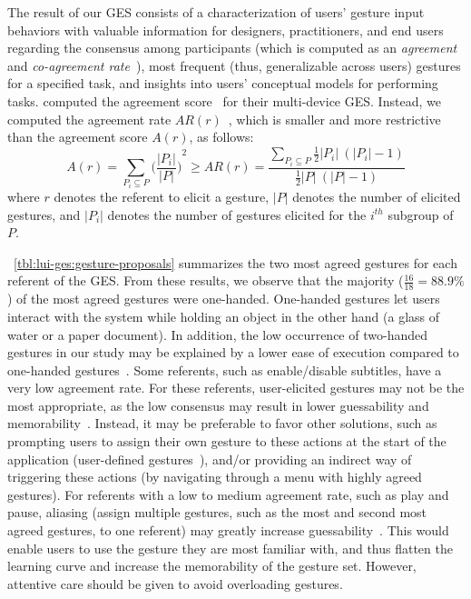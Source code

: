 The result of our GES consists of a characterization of users' gesture input behaviors with valuable information for designers, practitioners, and end users regarding the consensus among participants (which is computed as an \textit{agreement} and \textit{co-agreement rate}~\cite{Vatavu:2015}), most frequent (thus, generalizable across users) gestures for a specified task, and insights into users' conceptual models for performing tasks. \cite{Dingler:2018} computed the agreement score~\cite{Wobbrock:2009} for their multi-device GES. Instead, we computed the agreement rate $AR(r)$~\cite{Vatavu:2015}, which is smaller and more restrictive than the agreement score $A(r)$, as follows:
\vspace{-5pt}
\begin{equation}
A(r) = \sum_{P_i \subseteq P} {\Bigg( \frac{\lvert P_i \vert}{\lvert P \vert} \Bigg)}^2
\geq
AR(r)= \frac{
\sum_{P_i\subseteq P} {\frac{1}{2} \lvert P_i \vert  \:(\lvert P_i \vert{-}1)}}
{\frac{1}{2} \lvert P \vert   \:(\lvert P \vert{-}1)}
\label{eq:agreement1}
\end{equation}
where $r$ denotes the referent to elicit a gesture, $\lvert P \rvert$ denotes the number of elicited gestures, and $\vert P_{i} \rvert$ denotes the number of gestures elicited for the $i^{th}$ subgroup of $P$. 


\tab~\ref{tbl:lui-ges:gesture-proposals} summarizes the two most agreed gestures for each referent of the GES. 
From these results, we observe that the majority ($\frac{16}{18} {=} 88.9\%$) of the most agreed gestures were one-handed. One-handed gestures let users interact with the system while holding an object in the other hand (\eg a glass of water or a paper document). In addition, the low occurrence of two-handed gestures in our study may be explained by a lower ease of execution compared to one-handed gestures~\cite{Morris:2010}.
Some referents, such as enable/disable subtitles, have a very low agreement rate. For these referents, user-elicited gestures may not be the most appropriate, as the low consensus may result in lower guessability and memorability~\cite{Wobbrock:2005}. Instead, it may be preferable to favor other solutions, such as prompting users to assign their own gesture to these actions at the start of the application (\ie user-defined gestures~\cite{Nacenta:2013}), and/or providing an indirect way of triggering these actions (\eg by navigating through a menu with highly agreed gestures).
For referents with a low to medium agreement rate, such as play and pause, aliasing (\ie assign multiple gestures, such as the most and second most agreed gestures, to one referent) may greatly increase guessability~\cite{Wobbrock:2005, Wobbrock:2009}. This would enable users to use the gesture they are most familiar with, and thus flatten the learning curve and increase the memorability of the gesture set. However, attentive care should be given to avoid overloading gestures.

